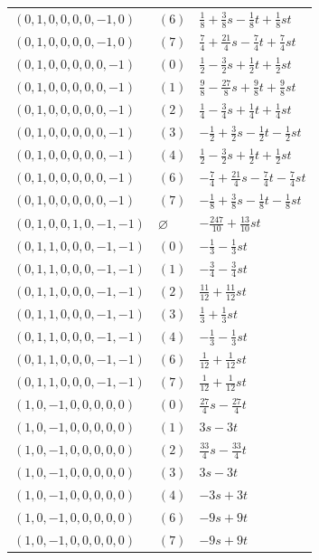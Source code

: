 \begin{longtable}{@{}lll@{}}
$(0,1,0,0,0,0,-1,0)$ & $(6)$ & $\frac{1}{8}+\frac{3}{8}s-\frac{1}{8}t+\frac{1}{8}st$\\
$(0,1,0,0,0,0,-1,0)$ & $(7)$ & $\frac{7}{4}+\frac{21}{4}s-\frac{7}{4}t+\frac{7}{4}st$\\
$(0,1,0,0,0,0,0,-1)$ & $(0)$ & $\frac{1}{2}-\frac{3}{2}s+\frac{1}{2}t+\frac{1}{2}st$\\
$(0,1,0,0,0,0,0,-1)$ & $(1)$ & $\frac{9}{8}-\frac{27}{8}s+\frac{9}{8}t+\frac{9}{8}st$\\
$(0,1,0,0,0,0,0,-1)$ & $(2)$ & $\frac{1}{4}-\frac{3}{4}s+\frac{1}{4}t+\frac{1}{4}st$\\
$(0,1,0,0,0,0,0,-1)$ & $(3)$ & $-\frac{1}{2}+\frac{3}{2}s-\frac{1}{2}t-\frac{1}{2}st$\\
$(0,1,0,0,0,0,0,-1)$ & $(4)$ & $\frac{1}{2}-\frac{3}{2}s+\frac{1}{2}t+\frac{1}{2}st$\\
$(0,1,0,0,0,0,0,-1)$ & $(6)$ & $-\frac{7}{4}+\frac{21}{4}s-\frac{7}{4}t-\frac{7}{4}st$\\
$(0,1,0,0,0,0,0,-1)$ & $(7)$ & $-\frac{1}{8}+\frac{3}{8}s-\frac{1}{8}t-\frac{1}{8}st$\\
$(0,1,0,0,1,0,-1,-1)$ & $\varnothing$ & $-\frac{247}{10}+\frac{13}{10}st$\\
$(0,1,1,0,0,0,-1,-1)$ & $(0)$ & $-\frac{1}{3}-\frac{1}{3}st$\\
$(0,1,1,0,0,0,-1,-1)$ & $(1)$ & $-\frac{3}{4}-\frac{3}{4}st$\\
$(0,1,1,0,0,0,-1,-1)$ & $(2)$ & $\frac{11}{12}+\frac{11}{12}st$\\
$(0,1,1,0,0,0,-1,-1)$ & $(3)$ & $\frac{1}{3}+\frac{1}{3}st$\\
$(0,1,1,0,0,0,-1,-1)$ & $(4)$ & $-\frac{1}{3}-\frac{1}{3}st$\\
$(0,1,1,0,0,0,-1,-1)$ & $(6)$ & $\frac{1}{12}+\frac{1}{12}st$\\
$(0,1,1,0,0,0,-1,-1)$ & $(7)$ & $\frac{1}{12}+\frac{1}{12}st$\\
$(1,0,-1,0,0,0,0,0)$ & $(0)$ & $\frac{27}{4}s-\frac{27}{4}t$\\
$(1,0,-1,0,0,0,0,0)$ & $(1)$ & $3s-3t$\\
$(1,0,-1,0,0,0,0,0)$ & $(2)$ & $\frac{33}{4}s-\frac{33}{4}t$\\
$(1,0,-1,0,0,0,0,0)$ & $(3)$ & $3s-3t$\\
$(1,0,-1,0,0,0,0,0)$ & $(4)$ & $-3s+3t$\\
$(1,0,-1,0,0,0,0,0)$ & $(6)$ & $-9s+9t$\\
$(1,0,-1,0,0,0,0,0)$ & $(7)$ & $-9s+9t$\\

\end{longtable}
